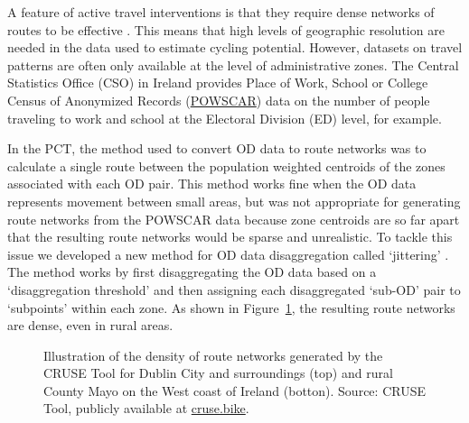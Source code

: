 \documentclass[
  super,
  preprint,
  3p]{elsarticle}
\begin{document}
A feature of active travel interventions is that they require dense
networks of routes to be effective \citep{parkin2018}. This means that
high levels of geographic resolution are needed in the data used to
estimate cycling potential. However, datasets on travel patterns are
often only available at the level of administrative zones. The Central
Statistics Office (CSO) in Ireland provides Place of Work, School or
College Census of Anonymized Records
(\href{https://www.cso.ie/en/census/census2016reports/powscar/}{POWSCAR})
data on the number of people traveling to work and school at the
Electoral Division (ED) level, for example.

In the PCT, the method used to convert OD data to route networks was to
calculate a single route between the population weighted centroids of
the zones associated with each OD pair. This method works fine when the
OD data represents movement between small areas, but was not appropriate
for generating route networks from the POWSCAR data because zone
centroids are so far apart that the resulting route networks would be
sparse and unrealistic. To tackle this issue we developed a new method
for OD data disaggregation called `jittering' \citep{lovelace2022}. The
method works by first disaggregating the OD data based on a
`disaggregation threshold' and then assigning each disaggregated
`sub-OD' pair to `subpoints' within each zone. As shown in
Figure~\ref{fig-dublin}, the resulting route networks are dense, even in
rural areas.

\begin{figure}


\caption{\label{fig-dublin}Illustration of the density of route networks
generated by the CRUSE Tool for Dublin City and surroundings (top) and
rural County Mayo on the West coast of Ireland (botton). Source: CRUSE
Tool, publicly available at \href{https://cruse.bike/}{cruse.bike}.}

\end{figure}%
\end{document}
